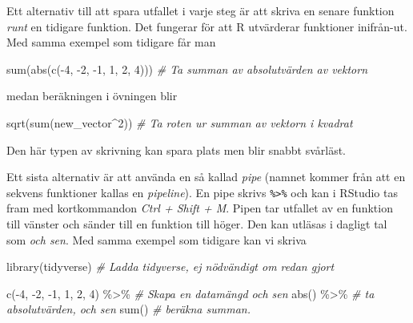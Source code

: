\documentclass[
]{book}
\newenvironment{Shaded}{\begin{snugshade}}{\end{snugshade}}
\newcommand{\CommentTok}[1]{\textcolor[rgb]{0.56,0.35,0.01}{\textit{#1}}}
\newcommand{\DecValTok}[1]{\textcolor[rgb]{0.00,0.00,0.81}{#1}}
\newcommand{\FunctionTok}[1]{\textcolor[rgb]{0.00,0.00,0.00}{#1}}
\newcommand{\NormalTok}[1]{#1}
\newcommand{\SpecialCharTok}[1]{\textcolor[rgb]{0.00,0.00,0.00}{#1}}
\theoremstyle{definition}
\theoremstyle{definition}
\theoremstyle{definition}
\theoremstyle{definition}
\theoremstyle{remark}
\begin{document}
Ett alternativ till att spara utfallet i varje steg är att skriva en senare funktion \emph{runt} en tidigare funktion. Det fungerar för att R utvärderar funktioner inifrån-ut. Med samma exempel som tidigare får man

\begin{Shaded}
\begin{Highlighting}[]
\FunctionTok{sum}\NormalTok{(}\FunctionTok{abs}\NormalTok{(}\FunctionTok{c}\NormalTok{(}\SpecialCharTok{{-}}\DecValTok{4}\NormalTok{, }\SpecialCharTok{{-}}\DecValTok{2}\NormalTok{, }\SpecialCharTok{{-}}\DecValTok{1}\NormalTok{, }\DecValTok{1}\NormalTok{, }\DecValTok{2}\NormalTok{, }\DecValTok{4}\NormalTok{)))       }\CommentTok{\# Ta summan av absolutvärden av vektorn}
\end{Highlighting}
\end{Shaded}

medan beräkningen i övningen blir

\begin{Shaded}
\begin{Highlighting}[]
\FunctionTok{sqrt}\NormalTok{(}\FunctionTok{sum}\NormalTok{(new\_vector}\SpecialCharTok{\^{}}\DecValTok{2}\NormalTok{))                }\CommentTok{\# Ta roten ur summan av vektorn i kvadrat}
\end{Highlighting}
\end{Shaded}

Den här typen av skrivning kan spara plats men blir snabbt svårläst.

Ett sista alternativ är att använda en så kallad \emph{pipe} (namnet kommer från att en sekvens funktioner kallas en \emph{pipeline}). En pipe skrivs \texttt{\%\textgreater{}\%} och kan i RStudio tas fram med kortkommandon \emph{Ctrl + Shift + M}. Pipen tar utfallet av en funktion till vänster och sänder till en funktion till höger. Den kan utläsas i dagligt tal som \emph{och sen}. Med samma exempel som tidigare kan vi skriva

\begin{Shaded}
\begin{Highlighting}[]
\FunctionTok{library}\NormalTok{(tidyverse)                     }\CommentTok{\# Ladda tidyverse, ej nödvändigt om redan gjort}

\FunctionTok{c}\NormalTok{(}\SpecialCharTok{{-}}\DecValTok{4}\NormalTok{, }\SpecialCharTok{{-}}\DecValTok{2}\NormalTok{, }\SpecialCharTok{{-}}\DecValTok{1}\NormalTok{, }\DecValTok{1}\NormalTok{, }\DecValTok{2}\NormalTok{, }\DecValTok{4}\NormalTok{) }\SpecialCharTok{\%\textgreater{}\%}             \CommentTok{\# Skapa en datamängd och sen}
  \FunctionTok{abs}\NormalTok{() }\SpecialCharTok{\%\textgreater{}\%}                            \CommentTok{\# ta absolutvärden, och sen}
  \FunctionTok{sum}\NormalTok{()                                }\CommentTok{\# beräkna summan.}
\end{Highlighting}
\end{Shaded}
\end{document}
